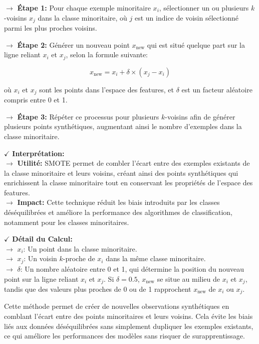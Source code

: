 \textbf{\(\rightarrow\)} \textbf{Étape 1:} Pour chaque exemple minoritaire \(x_i\), sélectionner un ou plusieurs \(k\)-voisins \(x_j\) dans la classe minoritaire, où \(j\) est un indice de voisin sélectionné parmi les plus proches voisins.
    
\textbf{\(\rightarrow\)} \textbf{Étape 2:} Générer un nouveau point \(x_{\text{new}}\) qui est situé quelque part sur la ligne reliant \(x_i\) et \(x_j\), selon la formule suivante:
    
    \[
    x_{\text{new}} = x_i + \delta \times (x_j - x_i)
    \]
    
    où \(x_i\) et \(x_j\) sont les points dans l'espace des features, et \(\delta\) est un facteur aléatoire compris entre 0 et 1.
    
\textbf{\(\rightarrow\)} \textbf{Étape 3:} Répéter ce processus pour plusieurs \(k\)-voisins afin de générer plusieurs points synthétiques, augmentant ainsi le nombre d'exemples dans la classe minoritaire.

\textbf{\(\checkmark\)} \textbf{Interprétation:}\\
\textbf{\(\rightarrow\)} \textbf{Utilité:} SMOTE permet de combler l'écart entre des exemples existants de la classe minoritaire et leurs voisins, créant ainsi des points synthétiques qui enrichissent la classe minoritaire tout en conservant les propriétés de l'espace des features.\\
\textbf{\(\rightarrow\)} \textbf{Impact:} Cette technique réduit les biais introduits par les classes déséquilibrées et améliore la performance des algorithmes de classification, notamment pour les classes minoritaires.

\textbf{\(\checkmark\)} \textbf{Détail du Calcul:}\\
\textbf{\(\rightarrow\)} \(x_i\): Un point dans la classe minoritaire.\\
\textbf{\(\rightarrow\)} \(x_j\): Un voisin \(k\)-proche de \(x_i\) dans la même classe minoritaire.\\
\textbf{\(\rightarrow\)} \(\delta\): Un nombre aléatoire entre 0 et 1, qui détermine la position du nouveau point sur la ligne reliant \(x_i\) et \(x_j\). Si \(\delta = 0.5\), \(x_{\text{new}}\) se situe au milieu de \(x_i\) et \(x_j\), tandis que des valeurs plus proches de 0 ou de 1 rapprochent \(x_{\text{new}}\) de \(x_i\) ou \(x_j\).

Cette méthode permet de créer de nouvelles observations synthétiques en comblant l'écart entre des points minoritaires et leurs voisins. Cela évite les biais liés aux données déséquilibrées sans simplement dupliquer les exemples existants, ce qui améliore les performances des modèles sans risquer de surapprentissage.

